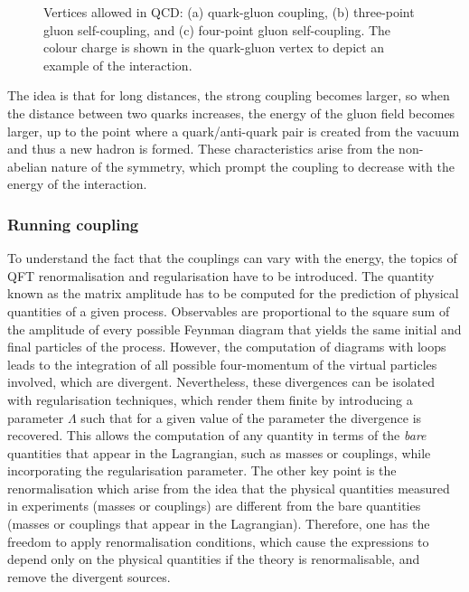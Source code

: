 \begin{figure}[htbp]
    \RawFloats
    \begin{center}
    \quad
    \quad
    \caption{Vertices allowed in QCD: (a) quark-gluon coupling, (b) three-point gluon self-coupling, and (c) four-point gluon self-coupling. The colour charge is shown in the quark-gluon vertex to depict an example of the interaction.}
    \label{figSM:QCDfey}
    \end{center}
\end{figure}

The idea is that for long distances, the strong coupling becomes larger, so when the distance between two quarks increases, the energy of the gluon field becomes larger, up to the point where a quark/anti-quark pair is created from the vacuum and thus a new hadron is formed. These characteristics arise from the non-abelian nature of the symmetry, which prompt the coupling to decrease with the energy of the interaction.

\subsubsection{Running coupling}

To understand the fact that the couplings can vary with the energy, the topics of \acrshort{QFT} renormalisation and regularisation have to be introduced. The quantity known as the matrix amplitude has to be computed for the prediction of physical quantities of a given process. Observables are proportional to the square sum of the amplitude of every possible Feynman diagram that yields the same initial and final particles of the process. However, the computation of diagrams with loops leads to the integration of all possible four-momentum of the virtual particles involved, which are divergent. Nevertheless, these divergences can be isolated with regularisation techniques, which render them finite by introducing a parameter $\Lambda$ such that for a given value of the parameter the divergence is recovered. This allows the computation of any quantity in terms of the \textit{bare} quantities that appear in the Lagrangian, such as masses or couplings, while incorporating the regularisation parameter. The other key point is the renormalisation which arise from the idea that the physical quantities measured in experiments (masses or couplings) are different from the bare quantities (masses or couplings that appear in the Lagrangian). Therefore, one has the freedom to apply renormalisation conditions, which cause the expressions to depend only on the physical quantities if the theory is renormalisable, and remove the divergent sources.\\

